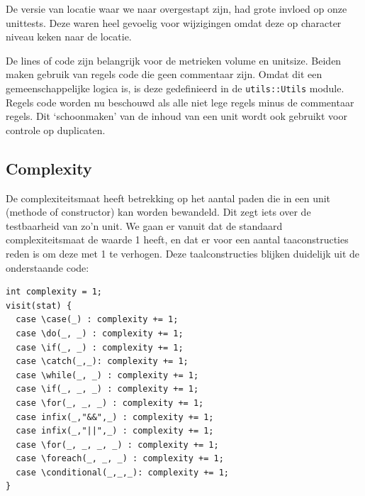 \documentclass[a4paper]{article}
\begin{document}
De versie van locatie waar we naar overgestapt zijn, had grote invloed op onze unittests. Deze waren heel gevoelig voor wijzigingen omdat deze op character niveau keken naar de locatie.

De lines of code zijn belangrijk voor de metrieken volume en unitsize. Beiden
maken gebruik van regels code die geen commentaar zijn. Omdat
dit een gemeenschappelijke logica is, is deze gedefinieerd in de
\texttt{utils::Utils} module.
Regels code worden nu beschouwd als alle niet lege regels minus
de commentaar regels. Dit `schoonmaken' van de inhoud van een unit wordt ook gebruikt voor controle op duplicaten.

\subsection{Complexity}
De complexiteitsmaat heeft betrekking op het aantal paden die in
een unit (methode of constructor) kan worden bewandeld. Dit zegt
iets over de testbaarheid van zo'n unit. We gaan er vanuit dat
de standaard complexiteitsmaat de waarde 1 heeft, en dat er voor
een aantal taaconstructies reden is om deze met 1 te verhogen.
Deze taalconstructies blijken duidelijk uit de onderstaande
code:

\begin{lstlisting}[caption={Taalsconstructies die de
complexiteit verhogen},label={lst:complexity},escapechar=|,
frame = single]
int complexity = 1;
visit(stat) {
  case \case(_) : complexity += 1;
  case \do(_, _) : complexity += 1;
  case \if(_, _) : complexity += 1;
  case \catch(_,_): complexity += 1;
  case \while(_, _) : complexity += 1;
  case \if(_, _, _) : complexity += 1;
  case \for(_, _, _) : complexity += 1;
  case infix(_,"&&",_) : complexity += 1;
  case infix(_,"||",_) : complexity += 1;    
  case \for(_, _, _, _) : complexity += 1;
  case \foreach(_, _, _) : complexity += 1;
  case \conditional(_,_,_): complexity += 1;
}
\end{lstlisting}
\end{document}
